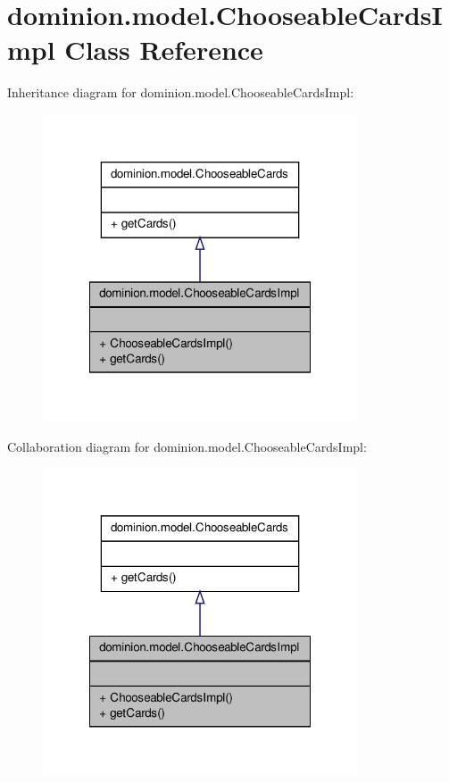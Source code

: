 \hypertarget{classdominion_1_1model_1_1ChooseableCardsImpl}{\section{dominion.\-model.\-Chooseable\-Cards\-Impl \-Class \-Reference}
\label{classdominion_1_1model_1_1ChooseableCardsImpl}
}


\-Inheritance diagram for dominion.\-model.\-Chooseable\-Cards\-Impl\-:
\nopagebreak
\begin{figure}[H]
\begin{center}
\leavevmode
\includegraphics[width=264pt]{classdominion_1_1model_1_1ChooseableCardsImpl__inherit__graph}
\end{center}
\end{figure}


\-Collaboration diagram for dominion.\-model.\-Chooseable\-Cards\-Impl\-:
\nopagebreak
\begin{figure}[H]
\begin{center}
\leavevmode
\includegraphics[width=264pt]{classdominion_1_1model_1_1ChooseableCardsImpl__coll__graph}
\end{center}
\end{figure}
